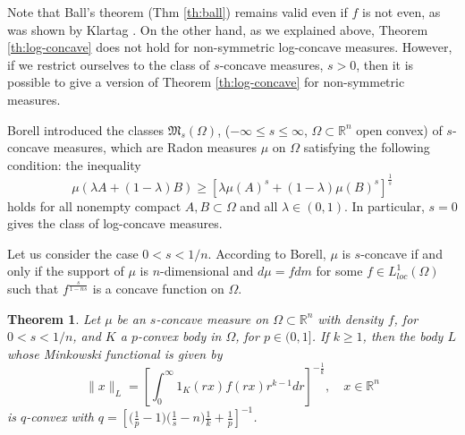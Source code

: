 \documentclass[12pt]{amsart} %
\newtheorem{theorem}{Theorem}
\renewcommand{\[}{\left[}
\renewcommand{\(}{\left(}
\renewcommand{\]}{\right]}
\renewcommand{\)}{\right)}
\renewcommand{\le}{\leqslant}
\renewcommand{\ge}{\geqslant}
\newcommand{\la}{\lambda}
\newcommand{\R}{\mathbb R}              %
\begin{document}
Note that Ball's theorem (Thm \ref{th:ball}) remains valid even if $f$ is not even, as was shown by Klartag \cite{Kl}. On the other hand,
as we explained above, Theorem \ref{th:log-concave} does not hold for non-symmetric log-concave measures. However, if we restrict ourselves to
the class of $s$-concave measures, $s>0$, then it is possible to give a version of Theorem \ref{th:log-concave} for non-symmetric measures.



Borell \cite{Bor} introduced the classes $\mathfrak{M}_s(\Omega)$, ($-\infty
\le s \le \infty$, $\Omega \subset \R^n$ open convex) of $s$-concave
measures, which are Radon measures $\mu$ on $\Omega$ satisfying the
following condition: the inequality
$$
\mu(\la A + (1-\la)B) \ge \left[\la \mu(A)^s + (1-\la)\mu(B)^s
\right]^{\frac 1s}
$$
holds for all nonempty compact $A, B \subset \Omega$ and all $\la \in
(0,1)$. In particular,   $s=0$ gives the class of log-concave measures.

Let us consider the case $0<s<1/n$. According to Borell, $\mu$ is
$s$-concave if and only if the support of $\mu$ is $n$-dimensional
and $d\mu = fdm$ for some $f \in L^1_{loc}(\Omega)$ such that
$f^{\frac{s}{1-ns}}$ is a concave function on $\Omega$.


\begin{theorem}
Let $\mu$ be an $s$-concave measure on $\Omega\subset\R^n$ with density $f$, for $0<s<1/n$, and $K$ a $p$-convex body in $\Omega$, for $p\in (0,1]$. If $k\ge 1$, then the body $L$ whose Minkowski functional is given by
$$
\|x\|_L = \left[\int_0^\infty 1_K(rx)f(rx)r^{k-1}dr\right]^{-\frac 1k},\quad x\in\R^n
$$
is $q$-convex with $q= \[\big(\frac 1p-1\big)\big(\frac 1s-n\big)\frac 1k + \frac 1p\]^{-1}$.
\end{theorem}
\end{document}
